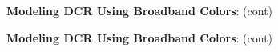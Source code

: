 \documentclass[DM,toc]{lsstdoc}
\begin{document}
\begin{figure}
    \ContinuedFloat
    \centering
    \caption[]{{\bf Modeling DCR Using Broadband Colors}: (cont)}
    \label{dcrmodel2}
\end{figure}
\begin{figure}
    \ContinuedFloat
    \centering
    \caption[]{{\bf Modeling DCR Using Broadband Colors}: (cont)}
    \label{dcrmodel2}
\end{figure}
\clearpage
\end{document}

